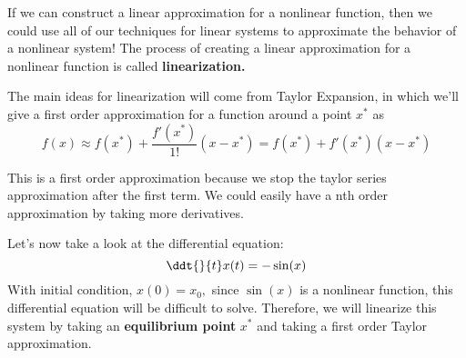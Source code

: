 If we can construct a linear approximation for a nonlinear function, then we could use all of our techniques for linear systems to approximate the behavior of a nonlinear system!
The process of creating a linear approximation for a nonlinear function is called \textbf{linearization.}

The main ideas for linearization will come from Taylor Expansion, in which we'll give a first order approximation for a function around a point $x^{*}$ as
\begin{equation} \label{eqn:ta}
  f(x) \approx f(x^{*}) + \frac{f'(x^{*})}{1!} (x - x^{*}) = f(x^{*}) + f'(x^{*}) (x - x^{*})
\end{equation}

This is a first order approximation because we stop the taylor series approximation after the first term.
We could easily have a nth order approximation by taking more derivatives.


Let's now take a look at the differential equation:
\begin{equation} \label{eqn:nl}
  \ddt{}{t} x(t) = - \sin(x)
\end{equation}
With initial condition, $x(0) = x_{0},$ since $\sin(x)$ is a nonlinear function, this differential equation will be difficult to solve.
Therefore, we will linearize this system by taking an \textbf{equilibrium point} $x^{*}$ and taking a first order Taylor approximation.

